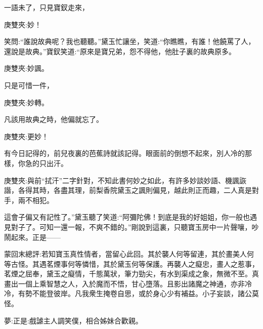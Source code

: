 \begin{parag}
    一語未了，只見寶釵走來，\begin{note}庚雙夾:妙！\end{note}笑問:“誰說故典呢？我也聽聽。”黛玉忙讓坐，笑道:“你瞧瞧，有誰！他饒罵了人，還說是故典。”寶釵笑道:“原來是寶兄弟，怨不得他，他肚子裏的故典原多。\begin{note}庚雙夾:妙諷。\end{note}只是可惜一件，\begin{note}庚雙夾:妙轉。\end{note}凡該用故典之時，他偏就忘了。\begin{note}庚雙夾:更妙！\end{note}有今日記得的，前兒夜裏的芭蕉詩就該記得。眼面前的倒想不起來，別人冷的那樣，你急的只出汗。\begin{note}庚雙夾:與前“拭汗”二字針對，不知此書何妙之如此，有許多妙談妙語、機諷詼諧，各得其時，各盡其理，前梨香院黛玉之諷則偏見，越此則正而趣，二人真是對手，兩不相犯。\end{note}這會子偏又有記性了。”黛玉聽了笑道:“阿彌陀佛！到底是我的好姐姐，你一般也遇見對子了。可知一還一報，不爽不錯的。”剛說到這裏，只聽寶玉房中一片聲嚷，吵鬧起來。正是——
\end{parag}


\begin{parag}
    \begin{note}蒙回末總評:若知寶玉真性情者，當留心此回。其於襲人何等留連，其於畫美人何等古怪。其遇茗煙事何等憐惜，其於黛玉何等保護。再襲人之癡忠，畫人之惹事，茗煙之屈奉，黛玉之癡情，千態萬狀，筆力勁尖，有水到渠成之象，無微不至。真畫出一個上乘智慧之人，入於魔而不悟，甘心墮落。且影出諸魔之神通，亦非冷冷，有勢不能登彼岸。凡我衆生掩卷自思，或於身心少有補益。小子妄談，諸公莫怪。\end{note}
\end{parag}


\begin{parag}
    \begin{note}夢:正是:戲謔主人調笑僕，相合姊妹合歡親。\end{note}
\end{parag}
